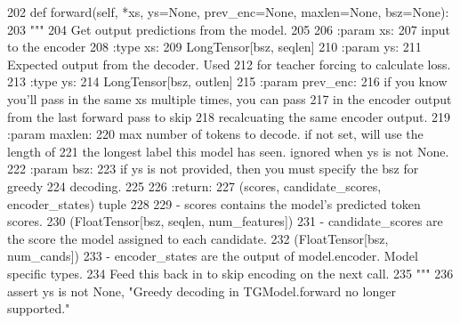\begin{DoxyCode}
202     \textcolor{keyword}{def }forward(self, *xs, ys=None, prev\_enc=None, maxlen=None, bsz=None):
203         \textcolor{stringliteral}{"""}
204 \textcolor{stringliteral}{        Get output predictions from the model.}
205 \textcolor{stringliteral}{}
206 \textcolor{stringliteral}{        :param xs:}
207 \textcolor{stringliteral}{            input to the encoder}
208 \textcolor{stringliteral}{        :type xs:}
209 \textcolor{stringliteral}{            LongTensor[bsz, seqlen]}
210 \textcolor{stringliteral}{        :param ys:}
211 \textcolor{stringliteral}{            Expected output from the decoder. Used}
212 \textcolor{stringliteral}{            for teacher forcing to calculate loss.}
213 \textcolor{stringliteral}{        :type ys:}
214 \textcolor{stringliteral}{            LongTensor[bsz, outlen]}
215 \textcolor{stringliteral}{        :param prev\_enc:}
216 \textcolor{stringliteral}{            if you know you'll pass in the same xs multiple times, you can pass}
217 \textcolor{stringliteral}{            in the encoder output from the last forward pass to skip}
218 \textcolor{stringliteral}{            recalcuating the same encoder output.}
219 \textcolor{stringliteral}{        :param maxlen:}
220 \textcolor{stringliteral}{            max number of tokens to decode. if not set, will use the length of}
221 \textcolor{stringliteral}{            the longest label this model has seen. ignored when ys is not None.}
222 \textcolor{stringliteral}{        :param bsz:}
223 \textcolor{stringliteral}{            if ys is not provided, then you must specify the bsz for greedy}
224 \textcolor{stringliteral}{            decoding.}
225 \textcolor{stringliteral}{}
226 \textcolor{stringliteral}{        :return:}
227 \textcolor{stringliteral}{            (scores, candidate\_scores, encoder\_states) tuple}
228 \textcolor{stringliteral}{}
229 \textcolor{stringliteral}{            - scores contains the model's predicted token scores.}
230 \textcolor{stringliteral}{              (FloatTensor[bsz, seqlen, num\_features])}
231 \textcolor{stringliteral}{            - candidate\_scores are the score the model assigned to each candidate.}
232 \textcolor{stringliteral}{              (FloatTensor[bsz, num\_cands])}
233 \textcolor{stringliteral}{            - encoder\_states are the output of model.encoder. Model specific types.}
234 \textcolor{stringliteral}{              Feed this back in to skip encoding on the next call.}
235 \textcolor{stringliteral}{        """}
236         \textcolor{keyword}{assert} ys \textcolor{keywordflow}{is} \textcolor{keywordflow}{not} \textcolor{keywordtype}{None}, \textcolor{stringliteral}{"Greedy decoding in TGModel.forward no longer supported."}

\end{DoxyCode}
